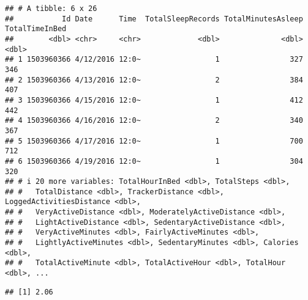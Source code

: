 \documentclass[
]{article}
\newenvironment{Shaded}{\begin{snugshade}}{\end{snugshade}}
\newcommand{\AttributeTok}[1]{\textcolor[rgb]{0.77,0.63,0.00}{#1}}
\newcommand{\CommentTok}[1]{\textcolor[rgb]{0.56,0.35,0.01}{\textit{#1}}}
\newcommand{\FunctionTok}[1]{\textcolor[rgb]{0.00,0.00,0.00}{#1}}
\newcommand{\NormalTok}[1]{#1}
\newcommand{\OtherTok}[1]{\textcolor[rgb]{0.56,0.35,0.01}{#1}}
\newcommand{\SpecialCharTok}[1]{\textcolor[rgb]{0.00,0.00,0.00}{#1}}
\newcommand{\StringTok}[1]{\textcolor[rgb]{0.31,0.60,0.02}{#1}}
\begin{document}
\begin{Shaded}
\end{Shaded}

\begin{verbatim}
## # A tibble: 6 x 26
##           Id Date      Time  TotalSleepRecords TotalMinutesAsleep TotalTimeInBed
##        <dbl> <chr>     <chr>             <dbl>              <dbl>          <dbl>
## 1 1503960366 4/12/2016 12:0~                 1                327            346
## 2 1503960366 4/13/2016 12:0~                 2                384            407
## 3 1503960366 4/15/2016 12:0~                 1                412            442
## 4 1503960366 4/16/2016 12:0~                 2                340            367
## 5 1503960366 4/17/2016 12:0~                 1                700            712
## 6 1503960366 4/19/2016 12:0~                 1                304            320
## # i 20 more variables: TotalHourInBed <dbl>, TotalSteps <dbl>,
## #   TotalDistance <dbl>, TrackerDistance <dbl>, LoggedActivitiesDistance <dbl>,
## #   VeryActiveDistance <dbl>, ModeratelyActiveDistance <dbl>,
## #   LightActiveDistance <dbl>, SedentaryActiveDistance <dbl>,
## #   VeryActiveMinutes <dbl>, FairlyActiveMinutes <dbl>,
## #   LightlyActiveMinutes <dbl>, SedentaryMinutes <dbl>, Calories <dbl>,
## #   TotalActiveMinute <dbl>, TotalActiveHour <dbl>, TotalHour <dbl>, ...
\end{verbatim}

\begin{Shaded}
\end{Shaded}

\begin{verbatim}
## [1] 2.06
\end{verbatim}

\begin{Shaded}
\end{Shaded}
\end{document}
